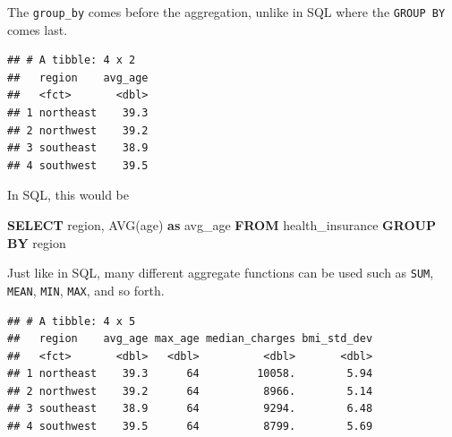 \documentclass[openany]{book}
\newenvironment{Shaded}{\begin{snugshade}}{\end{snugshade}}
\newcommand{\DataTypeTok}[1]{\textcolor[rgb]{0.13,0.29,0.53}{#1}}
\newcommand{\FunctionTok}[1]{\textcolor[rgb]{0.00,0.00,0.00}{#1}}
\newcommand{\KeywordTok}[1]{\textcolor[rgb]{0.13,0.29,0.53}{\textbf{#1}}}
\newcommand{\NormalTok}[1]{#1}
\newcommand{\OperatorTok}[1]{\textcolor[rgb]{0.81,0.36,0.00}{\textbf{#1}}}
\newcommand{\StringTok}[1]{\textcolor[rgb]{0.31,0.60,0.02}{#1}}
\begin{document}
The \texttt{group\_by} comes before the aggregation, unlike in SQL where the \texttt{GROUP\ BY} comes last.

\begin{Shaded}
\end{Shaded}

\begin{verbatim}
## # A tibble: 4 x 2
##   region    avg_age
##   <fct>       <dbl>
## 1 northeast    39.3
## 2 northwest    39.2
## 3 southeast    38.9
## 4 southwest    39.5
\end{verbatim}

In SQL, this would be

\begin{Shaded}
\begin{Highlighting}[]
\KeywordTok{SELECT}\NormalTok{ region, }
       \FunctionTok{AVG}\NormalTok{(age) }\KeywordTok{as}\NormalTok{ avg_age}
\KeywordTok{FROM}\NormalTok{ health_insurance}
\KeywordTok{GROUP} \KeywordTok{BY}\NormalTok{ region}
\end{Highlighting}
\end{Shaded}

Just like in SQL, many different aggregate functions can be used such as \texttt{SUM}, \texttt{MEAN}, \texttt{MIN}, \texttt{MAX}, and so forth.

\begin{Shaded}
\end{Shaded}

\begin{verbatim}
## # A tibble: 4 x 5
##   region    avg_age max_age median_charges bmi_std_dev
##   <fct>       <dbl>   <dbl>          <dbl>       <dbl>
## 1 northeast    39.3      64         10058.        5.94
## 2 northwest    39.2      64          8966.        5.14
## 3 southeast    38.9      64          9294.        6.48
## 4 southwest    39.5      64          8799.        5.69
\end{verbatim}
\end{document}
